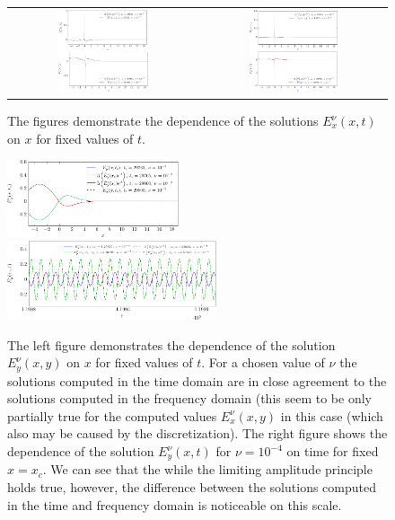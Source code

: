 \begin{figure}
\begin{tabular}{cc}
\includegraphics[width=0.5\textwidth]{res/ex_fixed_t-crop.pdf}&
\includegraphics[width=0.5\textwidth]{res/ex_fixed_t_1e3-crop.pdf}
\end{tabular}
\caption{The figures demonstrate the dependence of the solutions 
$E_x^{\nu}(x,t)$ on $x$ for fixed values of $t$. }
\label{fig:resonance_nus_ex_t}
\end{figure}
\begin{figure}
\includegraphics[width=0.45\textwidth]{res/ey_fixed_t_1e3-crop.pdf}
\includegraphics[width=0.55\textwidth]{res/ey_fixed_x_nu1e4-crop.pdf}
\caption{The left figure demonstrates the dependence of the solution  
$E_y^{\nu}(x,y)$ on $x$ for fixed values of $t$. For a chosen value of $\nu$ the solutions computed in the time domain are in close agreement 
to the solutions computed in the frequency domain (this seem to be only partially 
true for the computed values $E_x^{\nu}(x,y)$ in this case (which also may be caused by the discretization). 
The right figure shows the dependence of the solution $E_y^{\nu}(x,t)$ for $\nu=10^{-4}$ on time for fixed $x=x_c$. 
We can see that the while the limiting amplitude principle holds true, however, the difference between the solutions computed in 
the time and frequency domain is noticeable on this scale. 
}
\label{fig:resonance_nus_ey_t}
\end{figure}


